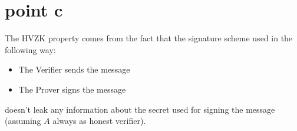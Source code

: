 \begin{figure}[h!]
    \centering
    \sdinit{}
\end{figure}

\newpage
\section{point c}

The HVZK property comes from the fact that the signature scheme used in the following way:

\begin{itemize}
    \item The Verifier sends the message
    \item The Prover signs the message
\end{itemize} 

doesn't leak any information about the secret used for signing the message (assuming $A$ always as honest verifier). 